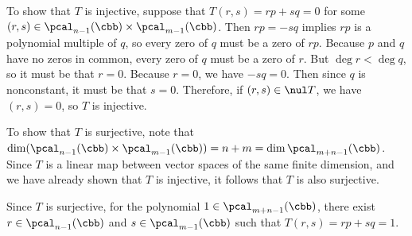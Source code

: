 \begin{solenum}
    \item To show that $T$ is injective, suppose that $T(r, s) = rp + sq = 0$ for some $(r, s) \in \pcal_{n-1}(\cbb) \times \pcal_{m-1}(\cbb)$.
    Then $rp = -sq$ implies $rp$ is a polynomial multiple of $q$, so every zero of $q$ must be a zero of $rp$.
    Because $p$ and $q$ have no zeros in common, every zero of $q$ must be a zero of $r$. But $\deg r < \deg q$, so it must be that $r = 0$.
    Because $r = 0$, we have $-sq = 0$. Then since $q$ is nonconstant, it must be that $s = 0$.
    Therefore, if $(r,s) \in \nul T$, we have $(r,s) = 0$, so $T$ is injective.
    \item To show that $T$ is surjective, note that $\dim(\pcal_{n-1}(\cbb) \times \pcal_{m-1}(\cbb)) = n + m = \dim \pcal_{m+n-1}(\cbb)$.
	Since $T$ is a linear map between vector spaces of the same finite dimension, and we have already shown that $T$ is injective, it follows that $T$ is also surjective.
    \item Since $T$ is surjective, for the polynomial $1 \in \pcal_{m+n-1}(\cbb)$, there exist $r \in \pcal_{n-1}(\cbb)$ and $s \in \pcal_{m-1}(\cbb)$ such that $T(r, s) = rp + sq = 1$.
\end{solenum}

\endgroup